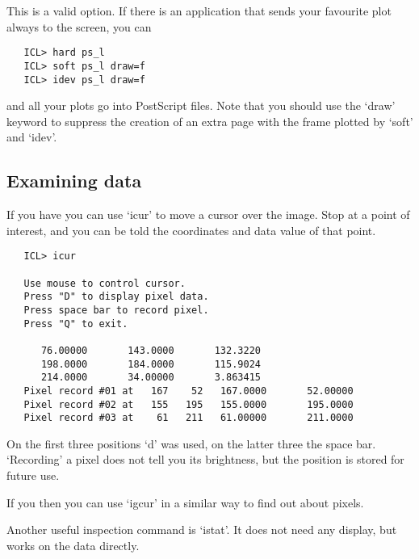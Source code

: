    This is a valid option. If there is an application that sends your
   favourite plot always to the screen, you can

\begin{verbatim}
   ICL> hard ps_l
   ICL> soft ps_l draw=f
   ICL> idev ps_l draw=f
\end{verbatim}

   and all your plots go into PostScript files. Note that you should use
   the `draw' keyword to suppress the creation of an extra page with the
   frame plotted by `soft' and `idev'.


\subsection{\label{examine}Examining data}

   If you have
   {}
   you can use `icur' to move a cursor over the image. Stop at a point
   of interest, and you can be told the coordinates and data value of
   that point.

\begin{verbatim}
   ICL> icur

   Use mouse to control cursor.
   Press "D" to display pixel data.
   Press space bar to record pixel.
   Press "Q" to exit.

      76.00000       143.0000       132.3220
      198.0000       184.0000       115.9024
      214.0000       34.00000       3.863415
   Pixel record #01 at   167    52   167.0000       52.00000
   Pixel record #02 at   155   195   155.0000       195.0000
   Pixel record #03 at    61   211   61.00000       211.0000
\end{verbatim}

   On the first three positions `d' was used, on the latter three the
   space bar. `Recording' a pixel does not tell you its brightness, but
   the position is stored for future use.

   If you
   {}
   then you can use `igcur' in a similar way to find out about pixels.

   Another useful inspection command is `istat'. It does not need any
   display, but works on the data directly.

